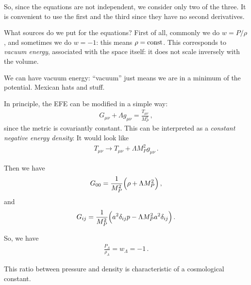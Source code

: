 \documentclass[main.tex]{subfiles}
\begin{document}
So, since the equations are not independent, we consider  only two of the three. It is convenient to use the first and the third since they have no second derivatives.  

What sources do we put for the equations? First of all, commonly we do \(w = P / \rho \), and sometimes we do \(w = -1\): this means \(\rho = \text{const}\). 
This corresponds to \emph{vacuum energy}, associated with the space itself: it does not scale inversely with the volume. 

We can have vacuum energy: ``vacuum'' just means we are in a minimum of the potential. Mexican hats and stuff. 

In principle, the EFE can be modified in a simple way: 
%
\begin{align}
  G_{\mu \nu } + \Lambda g_{\mu  \nu } = \frac{T_{\mu \nu }}{M_P^2}
\,,
\end{align}
%
since the metric is covariantly constant. This can be interpreted as a \emph{constant negative energy density}: It would look like 
%
\begin{align}
  T_{\mu \nu } \rightarrow T_{\mu \nu } + \Lambda M_P^2 g_{\mu \nu }
\,.
\end{align}

Then we have 
%
\begin{align}
  G_{00} = \frac{1}{M_P^2} \qty(\rho + \Lambda M_P^2)
\,,
\end{align}
%
and 
%
\begin{align}
  G_{ij} = \frac{1}{M_P^2} \qty(a^2 \delta_{ij} p - \Lambda M_P^2a^2 \delta_{ij})
\,.
\end{align}

So, we have 
%
\begin{align}
  \frac{P_{\Lambda }}{\rho_{\Lambda }} = w_{\Lambda } = -1
\,.
\end{align}

This ratio between pressure and density is characteristic of a cosmological constant. 
\end{document}
